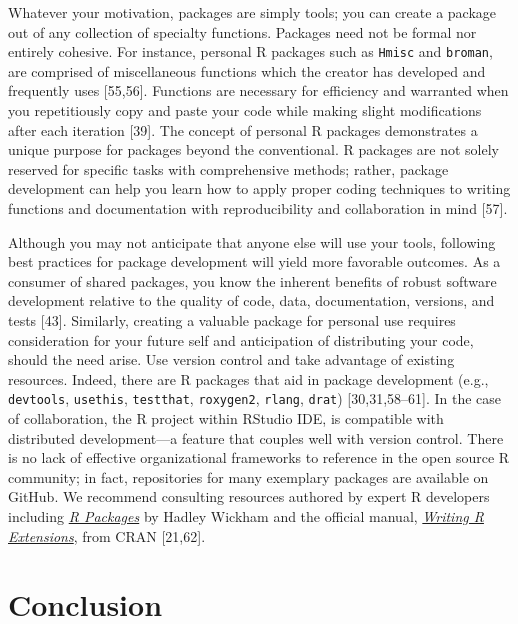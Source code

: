 \documentclass[10pt,letterpaper]{article}
\begin{document}
Whatever your motivation, packages are simply tools; you can create a
package out of any collection of specialty functions. Packages need not
be formal nor entirely cohesive. For instance, personal R packages such
as \texttt{Hmisc} and \texttt{broman}, are comprised of miscellaneous
functions which the creator has developed and frequently uses
{[}55,56{]}. Functions are necessary for efficiency and warranted when
you repetitiously copy and paste your code while making slight
modifications after each iteration {[}39{]}. The concept of personal R
packages demonstrates a unique purpose for packages beyond the
conventional. R packages are not solely reserved for specific tasks with
comprehensive methods; rather, package development can help you learn
how to apply proper coding techniques to writing functions and
documentation with reproducibility and collaboration in mind {[}57{]}.

Although you may not anticipate that anyone else will use your tools,
following best practices for package development will yield more
favorable outcomes. As a consumer of shared packages, you know the
inherent benefits of robust software development relative to the quality
of code, data, documentation, versions, and tests {[}43{]}. Similarly,
creating a valuable package for personal use requires consideration for
your future self and anticipation of distributing your code, should the
need arise. Use version control and take advantage of existing
resources. Indeed, there are R packages that aid in package development
(e.g., \texttt{devtools}, \texttt{usethis}, \texttt{testthat},
\texttt{roxygen2}, \texttt{rlang}, \texttt{drat}) {[}30,31,58--61{]}. In
the case of collaboration, the R project within RStudio IDE, is
compatible with distributed development---a feature that couples well
with version control. There is no lack of effective organizational
frameworks to reference in the open source R community; in fact,
repositories for many exemplary packages are available on GitHub. We
recommend consulting resources authored by expert R developers including
\href{https://r-pkgs.org/}{\emph{R Packages}} by Hadley Wickham and the
official manual,
\href{https://cran.r-project.org/doc/manuals/r-release/R-exts.html}{\emph{Writing
R Extensions}}, from CRAN {[}21,62{]}.

\hypertarget{conclusion}{%
\section{Conclusion}\label{conclusion}}
\end{document}
